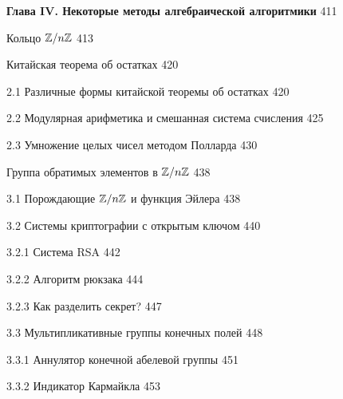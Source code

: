 \documentclass{mai_book}
\begin{document}
{\noindent \textbf{Глава IV. Некоторые методы алгебраической алгоритмики} \dotfill \hspace{0.5cm} 411
 
 \hspace{0.05cm} Кольцо \textbf{$\mathbb{Z}/\small{n}\mathbb{Z}$} \dotfill \hspace{0.5cm} 413
 
 \hspace{0.05cm} Китайская теорема об остатках \dotfill \hspace{0.5cm} 420
 
2.1 Различные формы китайской теоремы об остатках \dotfill \hspace{0.5cm} 420
 
2.2 Модулярная арифметика и смешанная система счисления \dotfill \hspace{0.5cm} 425
 
2.3 Умножение целых чисел методом Полларда \dotfill \hspace{0.5cm} 430
 
 \hspace{0.05cm} Группа обратимых элементов в $\mathbb{Z}/\small{n}\mathbb{Z}$ \dotfill \hspace{0.5cm} 438
 
3.1 Порождающие $\mathbb{Z}/\small{n}\mathbb{Z}$ и функция Эйлера \dotfill \hspace{0.5cm} 438
 
3.2 Системы криптографии с открытым ключом \dotfill \hspace{0.5cm} 440
 
\hspace{0.5cm} 3.2.1 Система RSA \dotfill \hspace{0.5cm} 442

\hspace{0.5cm} 3.2.2 Алгоритм рюкзака \dotfill \hspace{0.5cm} 444
 
\hspace{0.5cm}  3.2.3 Как разделить секрет? \dotfill \hspace{0.5cm} 447
 
3.3 Мультипликативные группы конечных полей \dotfill \hspace{0.5cm} 448
 
\hspace{0.5cm} 3.3.1 Аннулятор конечной абелевой группы \dotfill \hspace{0.5cm} 451
 
\hspace{0.5cm} 3.3.2 Индикатор Кармайкла \dotfill \hspace{0.5cm} 453
 
}
\end{document}
